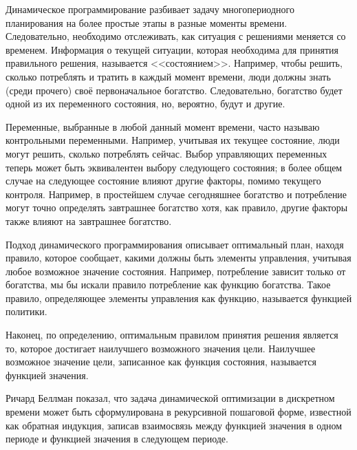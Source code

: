 Динамическое программирование разбивает задачу многопериодного планирования на более простые этапы в разные моменты времени. Следовательно, необходимо отслеживать, как ситуация с решениями меняется со временем. Информация о текущей ситуации, которая необходима для принятия правильного решения, называется <<состоянием>>. Например, чтобы решить, сколько потреблять и тратить в каждый момент времени, люди должны знать (среди прочего) своё первоначальное богатство. Следовательно, богатство будет одной из их переменного состояния, но, вероятно, будут и другие.

Переменные, выбранные в любой данный момент времени, часто называю контрольными переменными. Например, учитывая их текущее состояние, люди могут решить, сколько потреблять сейчас. Выбор управляющих переменных теперь может быть эквивалентен выбору следующего состояния; в более общем случае на следующее состояние влияют другие факторы, помимо текущего контроля. Например, в простейшем случае сегодняшнее богатство и потребление могут точно определять завтрашнее богатство хотя, как правило, другие факторы также влияют на завтрашнее богатство.

Подход динамического программирования описывает оптимальный план, находя правило, которое сообщает, какими должны быть элементы управления, учитывая любое возможное значение состояния. Например, потребление зависит только от богатства, мы бы искали правило потребление как функцию богатства. Такое правило, определяющее элементы управления как функцию, называется функцией политики.

Наконец, по определению, оптимальным правилом принятия решения является то, которое достигает наилучшего возможного значения цели. Наилучшее возможное значение цели, записанное как функция состояния, называется функцией значения.

Ричард Беллман показал, что задача динамической оптимизации в дискретном времени может быть сформулирована в рекурсивной пошаговой форме, известной как обратная индукция, записав взаимосвязь между функцией значения в одном периоде и функцией значения в следующем периоде.

